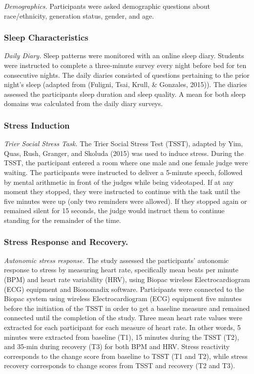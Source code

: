 \documentclass[man, fleqn, noextraspace]{apa6}
\begin{document}
\emph{Demographics.} Participants were asked demographic questions about race/ethnicity, generation status, gender, and age.

\hypertarget{sleep-characteristics}{%
\subsubsection{Sleep Characteristics}\label{sleep-characteristics}}

\emph{Daily Diary.} Sleep patterns were monitored with an online sleep diary. Students were instructed to complete a three-minute survey every night before bed for ten consecutive nights. The daily diaries consisted of questions pertaining to the prior night's sleep (adapted from (Fuligni, Tsai, Krull, \& Gonzales, 2015)). The diaries assessed the participants sleep duration and sleep quality. A mean for both sleep domains was calculated from the daily diary surveys.

\hypertarget{stress-induction}{%
\subsubsection{Stress Induction}\label{stress-induction}}

\emph{Trier Social Stress Task.} The Trier Social Stress Test (TSST), adapted by Yim, Quas, Rush, Granger, and Skoluda (2015) was used to induce stress. During the TSST, the participant entered a room where one male and one female judge were waiting. The participants were instructed to deliver a 5-minute speech, followed by mental arithmetic in front of the judges while being videotaped. If at any moment they stopped, they were instructed to continue with the task until the five minutes were up (only two reminders were allowed). If they stopped again or remained silent for 15 seconds, the judge would instruct them to continue standing for the remainder of the time.

\hypertarget{stress-response-and-recovery.}{%
\subsubsection{Stress Response and Recovery.}\label{stress-response-and-recovery.}}

\emph{Autonomic stress response.} The study assessed the participants' autonomic response to stress by measuring heart rate, specifically mean beats per minute (BPM) and heart rate variability (HRV), using Biopac wireless Electrocardiogram (ECG) equipment and Bionomadix software. Participants were connected to the Biopac system using wireless Electrocardiogram (ECG) equipment five minutes before the initiation of the TSST in order to get a baseline measure and remained connected until the completion of the study. Three mean heart rate values were extracted for each participant for each measure of heart rate. In other words, 5 minutes were extracted from baseline (T1), 15 minutes during the TSST (T2), and 35-min during recovery (T3) for both BPM and HRV. Stress reactivity corresponds to the change score from baseline to TSST (T1 and T2), while stress recovery corresponds to change scores from TSST and recovery (T2 and T3).
\end{document}
